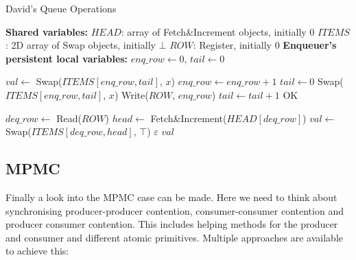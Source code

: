 \begin{algorithm}[!ht]
    \centering
    \captionsetup{justification=centering}
    \caption{David's Queue Operations \cite{Mateíspmc}}
    \label{alg:david-queue}
    \scriptsize
    \begin{algorithmic}[1]
        \State \textbf{Shared variables:}
        \State $HEAD$: array of Fetch\&Increment objects, initially 0
        \State $ITEMS$: 2D array of Swap objects, initially $\bot$
        \State $ROW$: Register, initially 0
        \State
        \State \textbf{Enqueuer's persistent local variables:}
        \State $enq\_row \gets 0$, $tail \gets 0$
        
        \State
        
         
            \State $val \gets$ Swap($ITEMS[enq\_row, tail]$, $x$) 
             
                \State $enq\_row \gets enq\_row + 1$ 
                \State $tail \gets 0$
                \State Swap($ITEMS[enq\_row, tail]$, $x$) 
                \State Write($ROW$, $enq\_row$) 
            \EndIf
            \State $tail \gets tail + 1$
            \State \Return OK
        \EndProcedure
        
        \State
        
         
            \State $deq\_row \gets$ Read($ROW$) 
            \State $head \gets$ Fetch\&Increment($HEAD[deq\_row]$) 
            \State $val \gets$ Swap($ITEMS[deq\_row, head]$, $\top$) 
             
                \State \Return $\varepsilon$ 
            \Else
                \State \Return $val$ 
            \EndIf
        \EndFunction
    \end{algorithmic}
\end{algorithm}

\subsection{\acf{MPMC}}\label{subsec:multiple-producer-and-multiple-consumer}
Finally a look into the \ac{MPMC} case can be made. Here we need to think about synchronising producer-producer contention, consumer-consumer contention and producer consumer contention. This includes helping methods for the producer and consumer and different atomic primitives. Multiple approaches are available to achieve this:

